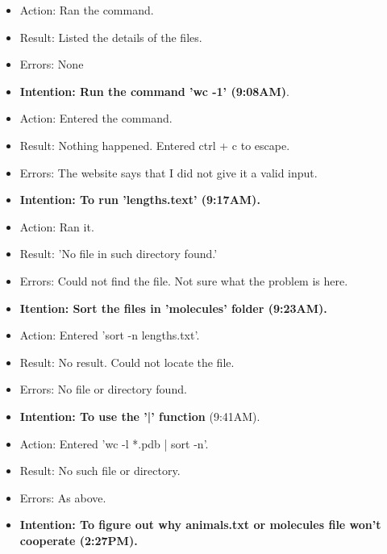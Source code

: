 \documentclass[a4paper,12pt]{article}
\begin{document}
\begin{itemize}
\begin{itemize}
\item Action: Ran the command. 

\item Result: Listed the details of the files. 

\item Errors: None

\item \textbf{Intention: Run the command 'wc -1' (9:08AM)}. 

\item Action: Entered the command.

\item Result: Nothing happened. Entered ctrl + c to escape. 

\item Errors: The website says that I did not give it a valid input. 

\item \textbf{Intention: To run 'lengths.text' (9:17AM).}

\item Action: Ran it. 

\item Result: 'No file in such directory found.' 

\item Errors: Could not find the file. Not sure what the problem is here. 

\item \textbf{Itention: Sort the files in 'molecules' folder (9:23AM).}

\item Action: Entered 'sort -n lengths.txt'. 

\item Result: No result. Could not locate the file. 

\item Errors: No file or directory found. 

\item \textbf{Intention: To use the '|' function} (9:41AM). 

\item Action: Entered 'wc -l *.pdb | sort -n'. 

\item Result: No such file or directory.

\item Errors: As above. 

\item \textbf{Intention: To figure out why animals.txt or molecules file won't cooperate (2:27PM).}


\end{itemize}
\end{itemize}
\end{document}
